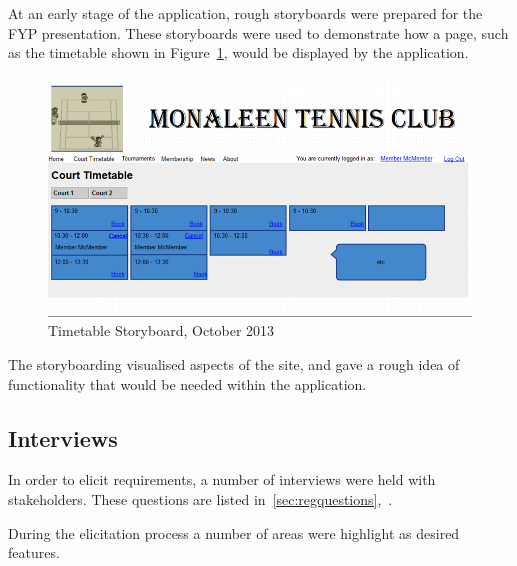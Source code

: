 At an early stage of the application, rough storyboards were prepared for the FYP presentation. These storyboards were used to demonstrate how a page, such as the timetable shown in Figure~\ref{fig:timetableSB}, would be displayed by the application.

\begin{figure}[H]
\begin{center}
\includegraphics[width=14cm]{storyboard.png}
\end{center}
\caption{Timetable Storyboard, October 2013}
\label{fig:timetableSB}
\end{figure}

The storyboarding visualised aspects of the site, and gave a rough idea of functionality that would be needed within the application. 

\subsection{Interviews}

In order to elicit requirements, a number of interviews were held with stakeholders. These questions are listed in~\ref{sec:regquestions},~.

During the elicitation process a number of areas were highlight as desired features.

